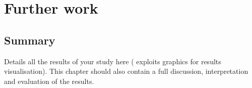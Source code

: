 
\chapter{Further work}
\label{chap:furtherwork}
\ifpdf
    \graphicspath{{Chapter4/Figures/PNG/}{Chapter3/Figures/PDF/}{Chapter4/Figures/}}
\else
    \graphicspath{{Chapter4/Figures/EPS/}{Chapter3/Figures/}}
\fi


\section*{Summary}
Details all the results of your study here ( exploits graphics for results visualisation). 
This chapter should also contain a full discussion, interpretation and evaluation of the results. 




